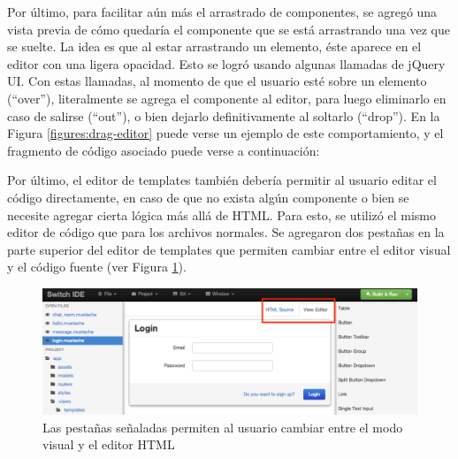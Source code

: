 \documentclass[12pt,spanish,letter]{report}
\makeatletter
\newenvironment{Shaded}{}{}
\newcommand{\KeywordTok}[1]{\textcolor[rgb]{0.00,0.44,0.13}{\textbf{{#1}}}}
\newcommand{\DataTypeTok}[1]{\textcolor[rgb]{0.56,0.13,0.00}{{#1}}}
\newcommand{\StringTok}[1]{\textcolor[rgb]{0.25,0.44,0.63}{{#1}}}
\newcommand{\CommentTok}[1]{\textcolor[rgb]{0.38,0.63,0.69}{\textit{{#1}}}}
\newcommand{\OtherTok}[1]{\textcolor[rgb]{0.00,0.44,0.13}{{#1}}}
\newcommand{\FunctionTok}[1]{\textcolor[rgb]{0.02,0.16,0.49}{{#1}}}
\newcommand{\NormalTok}[1]{{#1}}
\def\maxwidth{\ifdim\Gin@nat@width>\linewidth\linewidth
\else\Gin@nat@width\fi}
\let\Oldincludegraphics\includegraphics
\renewcommand{\includegraphics}[1]{\Oldincludegraphics[width=\maxwidth]{#1}}
\makeatother
\begin{document}
Por último, para facilitar aún más el arrastrado de componentes, se
agregó una vista previa de cómo quedaría el componente que se está
arrastrando una vez que se suelte. La idea es que al estar arrastrando
un elemento, éste aparece en el editor con una ligera opacidad. Esto se
logró usando algunas llamadas de jQuery UI. Con estas llamadas, al
momento de que el usuario esté sobre un elemento (``over''),
literalmente se agrega el componente al editor, para luego eliminarlo en
caso de salirse (``out''), o bien dejarlo definitivamente al soltarlo
(``drop''). En la Figura \ref{figures:drag-editor} puede verse un
ejemplo de este comportamiento, y el fragmento de código asociado puede
verse a continuación:

\begin{Shaded}
\end{Shaded}

Por último, el editor de templates también debería permitir al usuario
editar el código directamente, en caso de que no exista algún componente
o bien se necesite agregar cierta lógica más allá de HTML. Para esto, se
utilizó el mismo editor de código que para los archivos normales. Se
agregaron dos pestañas en la parte superior del editor de templates que
permiten cambiar entre el editor visual y el código fuente (ver Figura
\ref{figure:html-editor}).

\begin{figure}[htbp]
\centering
\includegraphics{figures/html-editor.png}
\caption{Las pestañas señaladas permiten al usuario cambiar entre el
modo visual y el editor HTML \label{figure:html-editor}}
\end{figure}
\end{document}
